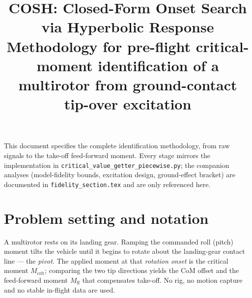 \documentclass[10pt]{article}
\title{\textbf{COSH: Closed-Form Onset Search via Hyperbolic Response}\\[2mm]
\large Methodology for pre-flight critical-moment identification of a
multirotor from ground-contact tip-over excitation}
\author{}
\date{}
\begin{document}
\maketitle
\vspace{-10mm}

\noindent
This document specifies the complete identification methodology, from raw
signals to the take-off feed-forward moment. Every stage mirrors the
implementation in \texttt{critical\_value\_getter\_piecewise.py}; the
companion analyses (model-fidelity bounds, excitation design, ground-effect
bracket) are documented in \texttt{fidelity\_section.tex} and are only
referenced here.

\section{Problem setting and notation}

A multirotor rests on its landing gear. Ramping the commanded roll (pitch)
moment tilts the vehicle until it begins to rotate about the landing-gear
contact line — the \emph{pivot}. The applied moment at that \emph{rotation
onset} is the critical moment $M_{\mathrm{crit}}$; comparing the two tip
directions yields the CoM offset and the feed-forward moment
$M_{\mathrm{ff}}$ that compensates take-off. No rig, no motion capture and
no stable in-flight data are used.
\end{document}
